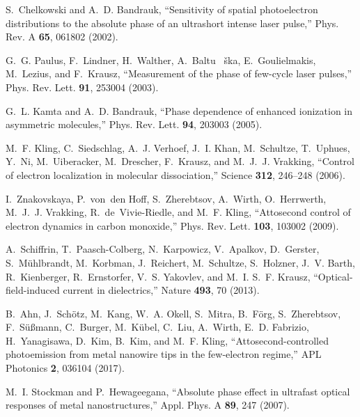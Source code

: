 \documentclass[9pt,twocolumn,twoside]{osajnl}
\begin{document}
\begin{thebibliography}{10}
\newcommand{\enquote}[1]{``#1''}

S.~Chelkowski and A.~D. Bandrauk, \enquote{Sensitivity of spatial photoelectron
  distributions to the absolute phase of an ultrashort intense laser pulse,}
  Phys. Rev. A \textbf{65}, 061802 (2002).

G.~G. Paulus, F.~Lindner, H.~Walther, A.~Baltu\ifmmode~\else
  \v{s}\fi{}ka, E.~Goulielmakis, M.~Lezius, and F.~Krausz, \enquote{Measurement
  of the phase of few-cycle laser pulses,} Phys. Rev. Lett. \textbf{91}, 253004
  (2003).

G.~L. Kamta and A.~D. Bandrauk, \enquote{Phase dependence of enhanced
  ionization in asymmetric molecules,} Phys. Rev. Lett. \textbf{94}, 203003
  (2005).

M.~F. Kling, C.~Siedschlag, A.~J. Verhoef, J.~I. Khan, M.~Schultze, T.~Uphues,
  Y.~Ni, M.~Uiberacker, M.~Drescher, F.~Krausz, and M.~J.~J. Vrakking,
  \enquote{Control of electron localization in molecular dissociation,} Science
  \textbf{312}, 246--248 (2006).

I.~Znakovskaya, P.~von~den Hoff, S.~Zherebtsov, A.~Wirth, O.~Herrwerth,
  M.~J.~J. Vrakking, R.~de~Vivie-Riedle, and M.~F. Kling, \enquote{Attosecond
  control of electron dynamics in carbon monoxide,} Phys. Rev. Lett.
  \textbf{103}, 103002 (2009).

A.~Schiffrin, T.~Paasch-Colberg, N.~Karpowicz, V.~Apalkov, D.~Gerster,
  S.~M{\"u}hlbrandt, M.~Korbman, J.~Reichert, M.~Schultze, S.~Holzner, J.~V.
  Barth, R.~Kienberger, R.~Ernstorfer, V.~S. Yakovlev, and M.~I. S.~F. Krausz,
  \enquote{Optical-field-induced current in dielectrics,} Nature \textbf{493},
  70 (2013).

B.~Ahn, J.~Sch{\"o}tz, M.~Kang, W.~A. Okell, S.~Mitra, B.~F{\"o}rg,
  S.~Zherebtsov, F.~S{\"u}{\ss}mann, C.~Burger, M.~K{\"u}bel, C.~Liu, A.~Wirth,
  E.~D. Fabrizio, H.~Yanagisawa, D.~Kim, B.~Kim, and M.~F. Kling,
  \enquote{Attosecond-controlled photoemission from metal nanowire tips in the
  few-electron regime,} APL Photonics \textbf{2}, 036104 (2017).

M.~I. Stockman and P.~Hewageegana, \enquote{{Absolute phase effect in ultrafast
  optical responses of metal nanostructures},} Appl. Phys. A \textbf{89}, 247
  (2007).


\end{thebibliography}
\end{document}
